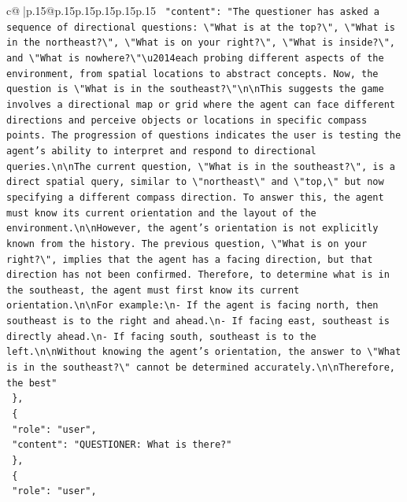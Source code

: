 \documentclass{article}
\begin{document}
{\begin{supertabular}{c@{$\;$}|p{.15\linewidth}@{}p{.15\linewidth}p{.15\linewidth}p{.15\linewidth}p{.15\linewidth}p{.15\linewidth}}
{{{\texttt{    "content": "The questioner has asked a sequence of directional questions: \textbackslash{}"What is at the top?\textbackslash{}", \textbackslash{}"What is in the northeast?\textbackslash{}", \textbackslash{}"What is on your right?\textbackslash{}", \textbackslash{}"What is inside?\textbackslash{}", and \textbackslash{}"What is nowhere?\textbackslash{}"\textbackslash{}u2014each probing different aspects of the environment, from spatial locations to abstract concepts. Now, the question is \textbackslash{}"What is in the southeast?\textbackslash{}"\textbackslash{}n\textbackslash{}nThis suggests the game involves a directional map or grid where the agent can face different directions and perceive objects or locations in specific compass points. The progression of questions indicates the user is testing the agent's ability to interpret and respond to directional queries.\textbackslash{}n\textbackslash{}nThe current question, \textbackslash{}"What is in the southeast?\textbackslash{}", is a direct spatial query, similar to \textbackslash{}"northeast\textbackslash{}" and \textbackslash{}"top,\textbackslash{}" but now specifying a different compass direction. To answer this, the agent must know its current orientation and the layout of the environment.\textbackslash{}n\textbackslash{}nHowever, the agent's orientation is not explicitly known from the history. The previous question, \textbackslash{}"What is on your right?\textbackslash{}", implies that the agent has a facing direction, but that direction has not been confirmed. Therefore, to determine what is in the southeast, the agent must first know its current orientation.\textbackslash{}n\textbackslash{}nFor example:\textbackslash{}n{-} If the agent is facing north, then southeast is to the right and ahead.\textbackslash{}n{-} If facing east, southeast is directly ahead.\textbackslash{}n{-} If facing south, southeast is to the left.\textbackslash{}n\textbackslash{}nWithout knowing the agent's orientation, the answer to \textbackslash{}"What is in the southeast?\textbackslash{}" cannot be determined accurately.\textbackslash{}n\textbackslash{}nTherefore, the best"} \\
\texttt{  \},} \\
\texttt{  \{} \\
\texttt{    "role": "user",} \\
\texttt{    "content": "QUESTIONER: What is there?"} \\
\texttt{  \},} \\
\texttt{  \{} \\
\texttt{    "role": "user",} \\
}}}
\end{supertabular}}
\end{document}
